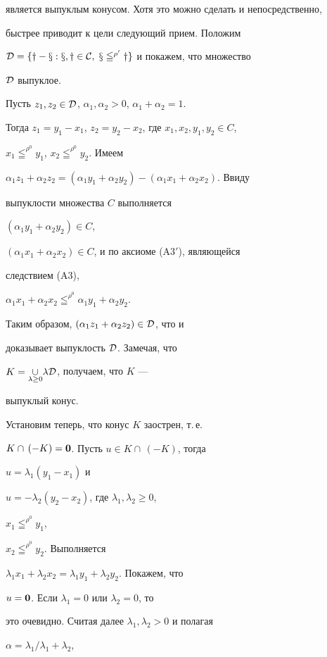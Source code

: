 является выпуклым конусом. Хотя это можно сделать и непосредственно, 


быстрее приводит к цели следующий прием. Положим 


$\cal D=\{y-x:x,y\in C,\;x\leqq^{\rho^0}y\}$ и покажем, что множество 


$\cal D$ выпуклое. 


Пусть $z_1,z_2\in\cal D$, $\alpha_1,\alpha_2>0$, $\alpha_1+\alpha_2=1$. 


Тогда $z_1=y_1-x_1$, $z_2=y_2-x_2$, где $x_1,x_2,y_1,y_2\in C$, 


$x_1\leqq^{\rho^0}y_1$, $x_2\leqq^{\rho^0}y_2$. Имеем 


$\alpha_1z_1+\alpha_2z_2=(\alpha_1y_1+\alpha_2y_2)- 


(\alpha_1x_1+\alpha_2x_2)$. Ввиду 


выпуклости множества $C$ выполняется 


$(\alpha_1y_1+\alpha_2y_2)\in C$, 


$(\alpha_1x_1+\alpha_2x_2)\in C$, и по аксиоме (A3${}'$), являющейся 


следствием (A3), 


$\alpha_1x_1+\alpha_2x_2\leqq^{\rho^0}\alpha_1y_1+\alpha_2y_2$. 


Таким образом, $(\alpha_1z_1+\alpha_2z_2)\in\cal D$, что и 


доказывает выпуклость $\cal D$. Замечая, что 


$K=\underset{\lambda\ge 0}{\cup}{}\lambda\cal D$, получаем, что $K$ --- 


выпуклый конус. 


 


Установим теперь, что конус $K$ заострен, т.\,е. 


$K\cap\,(-K)=\bold 0$. Пусть $u\in K\cap\,(-K)$, тогда 


$u=\lambda_1(y_1-x_1)$ и 


$u=-\lambda_2(y_2-x_2)$, где $\lambda_1,\lambda_2\ge 0$, 


$x_1\leqq^{\rho^0}y_1$, 


$x_2\leqq^{\rho^0}y_2$. Выполняется 


$\lambda_1x_1+\lambda_2x_2=\lambda_1y_1+\lambda_2y_2$. Покажем, что 


$u=\bold 0$. Если $\lambda_1=0$ или $\lambda_2=0$, то 


это очевидно. Считая далее $\lambda_1,\lambda_2>0$ и полагая 


$\alpha=\lambda_1/\lambda_1+\lambda_2$, 



